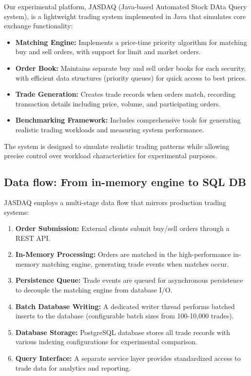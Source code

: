 \documentclass[11pt,a4paper]{article}
\begin{document}
Our experimental platform, JASDAQ (Java-based Automated Stock DAta Query system), is a lightweight trading system implemented in Java that simulates core exchange functionality:

\begin{itemize}
    \item \textbf{Matching Engine:} Implements a price-time priority algorithm for matching buy and sell orders, with support for limit and market orders.
    
    \item \textbf{Order Book:} Maintains separate buy and sell order books for each security, with efficient data structures (priority queues) for quick access to best prices.
    
    \item \textbf{Trade Generation:} Creates trade records when orders match, recording transaction details including price, volume, and participating orders.
    
    \item \textbf{Benchmarking Framework:} Includes comprehensive tools for generating realistic trading workloads and measuring system performance.
\end{itemize}

The system is designed to simulate realistic trading patterns while allowing precise control over workload characteristics for experimental purposes.

\subsection{Data flow: From in-memory engine to SQL DB}

JASDAQ employs a multi-stage data flow that mirrors production trading systems:

\begin{enumerate}
    \item \textbf{Order Submission:} External clients submit buy/sell orders through a REST API.
    
    \item \textbf{In-Memory Processing:} Orders are matched in the high-performance in-memory matching engine, generating trade events when matches occur.
    
    \item \textbf{Persistence Queue:} Trade events are queued for asynchronous persistence to decouple the matching engine from database I/O.
    
    \item \textbf{Batch Database Writing:} A dedicated writer thread performs batched inserts to the database (configurable batch sizes from 100-10,000 trades).
    
    \item \textbf{Database Storage:} PostgreSQL database stores all trade records with various indexing configurations for experimental comparison.
    
    \item \textbf{Query Interface:} A separate service layer provides standardized access to trade data for analytics and reporting.
\end{enumerate}
\end{document}
